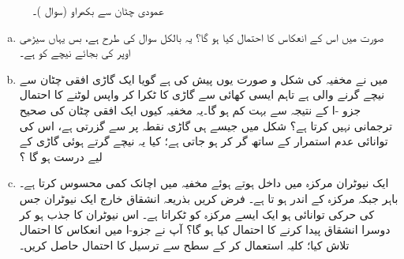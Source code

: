 \begin{figure}
\centering
{}
\caption{عمودی چٹان سے بکھراو (سوال )۔}
\label{شکل_غیر_تابع_شروڈنگر_عمودی_چٹان_بکھراو}
\end{figure}
%
\begin{enumerate}[a.]
\item
 صورت میں اس کے انعکاس کا احتمال کیا ہو گا؟  یہ بالکل سوال  کی طرح ہے، بس یہاں سیڑھی اوپر کی بجائے نیچے کو ہے۔
\item 
 میں نے مخفیہ کی شکل و صورت یوں پیش کی ہے گویا ایک گاڑی افقی چٹان سے نیچے گرنے والی ہے تاہم ایسی کھائی سے گاڑی کا ٹکرا کر واپس لوٹنے کا احتمال جزو -ا کے نتیجہ سے بہت کم ہو گا۔یہ مخفیہ کیوں ایک افقی چٹان کی صحیح ترجمانی نہیں کرتا ہے؟  شکل  میں جیسے ہی گاڑی نقطہ  پر سے گزرتی ہے، اس کی توانائی عدم استمرار کے ساتھ گر کر ہو جاتی ہے؛ کیا یہ نیچے گرتے ہوئی گاڑی کے لیے درست ہو گا ؟
\item
ایک نیوٹران مرکزہ میں داخل ہوتے ہوئے مخفیہ میں اچانک کمی محسوس کرتا ہے۔ باہر  جبکہ مرکزہ کے اندر  ہو تا ہے۔ فرض کریں بذریعہ انشقاق خارج ایک نیوٹران جس کی حرکی توانائی  ہو ایک ایسے مرکزہ کو ٹکراتا ہے۔ اس نیوٹران کا جذب ہو کر دوسرا انشقاق پیدا کرنے کا احتمال کیا ہو گا؟  آپ نے جزو-ا میں انعکاس کا احتمال تلاش کیا؛ کلیہ  استعمال کر کے سطح سے ترسیل کا احتمال حاصل کریں۔
\end{enumerate}

